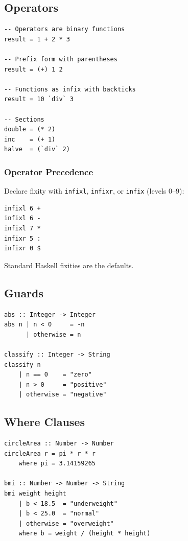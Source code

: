 \documentclass[11pt,a4paper]{article}
\begin{document}
\subsection{Operators}

\begin{lstlisting}
-- Operators are binary functions
result = 1 + 2 * 3

-- Prefix form with parentheses
result = (+) 1 2

-- Functions as infix with backticks
result = 10 `div` 3

-- Sections
double = (* 2)
inc    = (+ 1)
halve  = (`div` 2)
\end{lstlisting}

\subsubsection{Operator Precedence}

Declare fixity with \texttt{infixl}, \texttt{infixr}, or \texttt{infix}
(levels 0--9):

\begin{lstlisting}
infixl 6 +
infixl 6 -
infixl 7 *
infixr 5 :
infixr 0 $
\end{lstlisting}

Standard Haskell fixities are the defaults.

\subsection{Guards}

\begin{lstlisting}
abs :: Integer -> Integer
abs n | n < 0     = -n
      | otherwise = n

classify :: Integer -> String
classify n
    | n == 0    = "zero"
    | n > 0     = "positive"
    | otherwise = "negative"
\end{lstlisting}

\subsection{Where Clauses}

\begin{lstlisting}
circleArea :: Number -> Number
circleArea r = pi * r * r
    where pi = 3.14159265

bmi :: Number -> Number -> String
bmi weight height
    | b < 18.5  = "underweight"
    | b < 25.0  = "normal"
    | otherwise = "overweight"
    where b = weight / (height * height)
\end{lstlisting}
\end{document}
